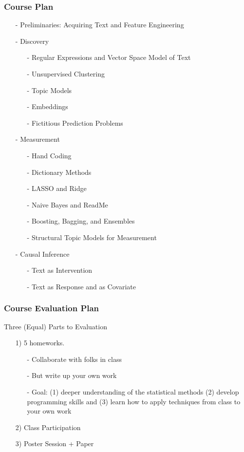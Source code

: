 \documentclass{beamer}
\numberwithin{equation}{section}
\begin{document}
\begin{frame}
\frametitle{Course Plan}

\begin{itemize}
\item[-] Preliminaries: Acquiring Text and Feature Engineering
\item[-] Discovery 
\begin{itemize}
\item[-] Regular Expressions and Vector Space Model of Text
\item[-] Unsupervised Clustering 
\item[-] Topic Models
\item[-] Embeddings 
\item[-] Fictitious Prediction Problems
\end{itemize}  
\item[-] Measurement
\begin{itemize}
  \item[-] Hand Coding
  \item[-] Dictionary Methods
  \item[-] LASSO and Ridge
  \item[-] Naive Bayes and ReadMe
  \item[-] Boosting, Bagging, and Ensembles
  \item[-] Structural Topic Models for Measurement
\end{itemize}
\item[-] Causal Inference
\begin{itemize}
\item[-] Text as Intervention
\item[-] Text as Response and as Covariate
\end{itemize}  
\end{itemize}  

\end{frame}


\begin{frame}
\frametitle{Course Evaluation Plan}

Three (Equal) Parts to Evaluation 

\begin{itemize}
  \item[1)] 5 homeworks. 
  \begin{itemize}
    \item[-] Collaborate with folks in class
    \item[-] But write up your own work
    \item[-] Goal: (1) deeper understanding of the statistical methods (2) develop programming skills and (3) learn how to apply techniques from class to your own work
  \end{itemize}
  \item[2)] Class Participation 
  \item[3)] Poster Session + Paper
\end{itemize}  


\end{frame}
\end{document}
